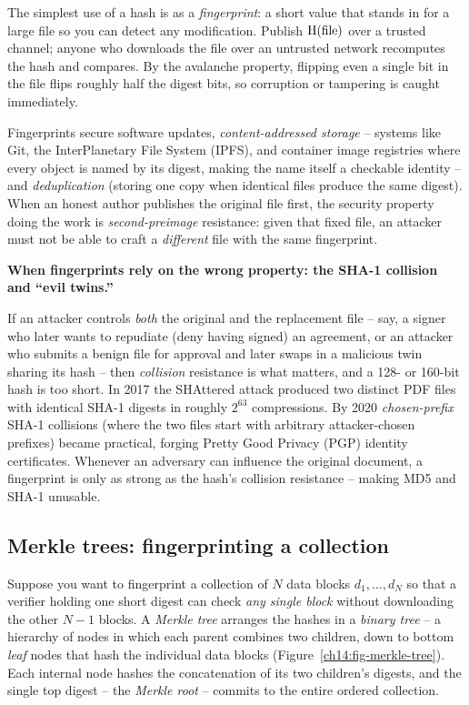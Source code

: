 The simplest use of a hash is as a \emph{fingerprint}: a short value that stands in for a large file so you can detect any modification. Publish $\operatorname{H}(\text{file})$ over a trusted channel; anyone who downloads the file over an untrusted network recomputes the hash and compares. By the avalanche property, flipping even a single bit in the file flips roughly half the digest bits, so corruption or tampering is caught immediately.

Fingerprints secure software updates, \emph{content-addressed storage} -- systems like Git, the InterPlanetary File System (IPFS), and container image registries where every object is named by its digest, making the name itself a checkable identity -- and \emph{deduplication} (storing one copy when identical files produce the same digest). When an honest author publishes the original file first, the security property doing the work is \emph{second-preimage} resistance: given that fixed file, an attacker must not be able to craft a \emph{different} file with the same fingerprint.

\begin{attackbox}
\textbf{When fingerprints rely on the wrong property: the SHA-1 collision and ``evil twins.''}

If an attacker controls \emph{both} the original and the replacement file -- say, a signer who later wants to repudiate (deny having signed) an agreement, or an attacker who submits a benign file for approval and later swaps in a malicious twin sharing its hash -- then \emph{collision} resistance is what matters, and a 128- or 160-bit hash is too short. In 2017 the SHAttered attack produced two distinct PDF files with identical SHA-1 digests in roughly $2^{63}$ compressions. By 2020 \emph{chosen-prefix} SHA-1 collisions (where the two files start with arbitrary attacker-chosen prefixes) became practical, forging Pretty Good Privacy (PGP) identity certificates. Whenever an adversary can influence the original document, a fingerprint is only as strong as the hash's collision resistance -- making MD5 and SHA-1 unusable.
\end{attackbox}

\subsection{Merkle trees: fingerprinting a collection}

Suppose you want to fingerprint a collection of $N$ data blocks $d_1, \dots, d_N$ so that a verifier holding one short digest can check \emph{any single block} without downloading the other $N - 1$ blocks. A \emph{Merkle tree} arranges the hashes in a \emph{binary tree} -- a hierarchy of nodes in which each parent combines two children, down to bottom \emph{leaf} nodes that hash the individual data blocks (Figure~\ref{ch14:fig-merkle-tree}). Each internal node hashes the concatenation of its two children's digests, and the single top digest -- the \emph{Merkle root} -- commits to the entire ordered collection.

